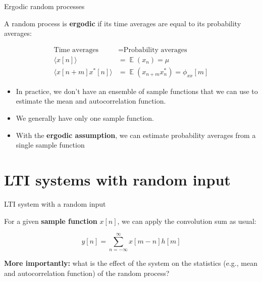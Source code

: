 \documentclass[10pt, handout]{beamer}
\DeclareMathOperator{\E}{\mathbb{E}} %
\begin{document}
\begin{frame}{Ergodic random processes}

A random process is \textbf{ergodic} if its time averages are equal to its probability averages:

\begin{align*}
\text{Time averages} &= \text{Probability averages} \\
\langle x[n] \rangle &= \E(x_n) = \mu \tag{expected value} \\
\langle x[n+m]x^*[n] \rangle &= \E(x_{n+m}x_n^*) = \phi_{xx}[m] \tag{autocorrelation function}
\end{align*}

\begin{itemize}
	\pause\item In practice, we don't have an ensemble of sample functions that we can use to estimate the mean and autocorrelation function.
	\pause\item We generally have only one sample function.
	\pause\item With the \textbf{ergodic assumption}, we can estimate probability averages from a single sample function
\end{itemize}

\end{frame}

%
\section{LTI systems with random input}
\begin{frame}{LTI system with a random input}
\begin{center}
\resizebox{\linewidth}{!}{}
\end{center}

\pause
For a given \textbf{sample function} $x[n]$, we can apply the convolution sum as usual:

\begin{equation*}
y[n] = \sum_{n=-\infty}^{\infty} x[m-n]h[m] 
\end{equation*}

\pause\textbf{More importantly:} what is the effect of the system on the statistics (e.g., mean and autocorrelation function) of the random process?

\end{frame}
\end{document}
